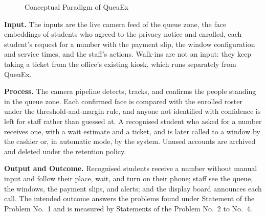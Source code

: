 \documentclass{research}
\newcommand{\sysname}{QueuEx}
\begin{document}
\begin{figure}[!htbp]
  \caption{Conceptual Paradigm of \sysname{}}
  \label{fig:conceptual-framework}
\end{figure}

\textbf{Input.} The inputs are the live camera feed of the queue zone,
the face embeddings of students who agreed to the privacy notice and
enrolled, each student's request for a number with the payment slip,
the window configuration and service times, and the staff's actions.
Walk-ins are not an input: they keep taking a ticket from the office's
existing kiosk, which runs separately from \sysname{}.

\textbf{Process.} The camera pipeline detects, tracks, and confirms the
people standing in the queue zone. Each confirmed face is compared with
the enrolled roster under the threshold-and-margin rule, and anyone not
identified with confidence is left for staff rather than guessed at. A
recognised student who asked for a number receives one, with a wait
estimate and a ticket, and is later called to a window by the cashier
or, in automatic mode, by the system. Unused accounts are archived and
deleted under the retention policy.

\textbf{Output and Outcome.} Recognised students receive a number
without manual input and follow their place, wait, and turn on their
phone; staff see the queue, the windows, the payment slips, and alerts;
and the display board announces each call. The intended outcome answers
the problems found under Statement of the Problem No.~1 and is measured
by Statements of the Problem No.~2 to No.~4.
\end{document}
